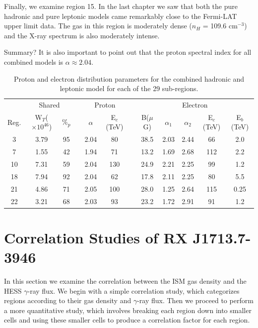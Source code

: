 \documentclass[12pt,a4paper]{article}
\begin{document}
Finally, we examine region 15. In the last chapter we saw that both the pure hadronic and pure leptonic models came remarkably close to the Fermi-LAT upper limit data. The gas in this region is moderately dense ($n_H$ = 109.6 cm$^{-3}$) and the X-ray spectrum is also moderately intense. 


Summary? It is also important to point out that the proton spectral index for all combined models is $\alpha \approx 2.04$. 
\begin{table}[H] 
	\begin{center}
		\begin{tabular}{cccccccccccc}
			\toprule 
			&
			\multicolumn{2}{c}{Shared} 
			&&
			\multicolumn{2}{c}{Proton} 
			&&
			\multicolumn{5}{c}{Electron}\\
			\cline{2-3} \cline{5-6} \cline{8-12}
			Reg.& W$_{T}$($\times 10^{46}$) & $\%_p$ && $\alpha$ & E$_c$(TeV) && B($\mu$G)&$\alpha_1$& $\alpha_2$ & E$_c$(TeV) & E$_b$(TeV)  \\
			\hline
			3 & 3.79 & 95 && 2.04 & 80 && 38.5 & 2.03 & 2.44 & 66 & 2.0\\
			7 & 1.55 & 42 && 1.94 & 71 && 13.2 & 1.69 & 2.68 & 112 & 2.2\\ 
			10 & 7.31 & 59 && 2.04 & 130 && 24.9 & 2.21 & 2.25 & 99 & 1.2\\ 
			18 & 7.94 & 92 && 2.04 & 62 && 17.8 & 2.11 & 2.25 & 80 & 5.5\\ 
			21 & 4.86 & 71 && 2.05 & 100 && 28.0 & 1.25 & 2.64 & 115 & 0.25\\ 
			22 & 3.21 & 68 && 2.03 & 93 && 23.2 & 1.72 & 2.91 & 91 & 1.2\\ 
			\bottomrule 
		\end{tabular} 
	\end{center}
	\caption{Proton and electron distribution parameters for the combined hadronic and leptonic model for each of the 29 sub-regions.}
	\label{tab:regionalparamscomb}
\end{table}


\newpage
\section{Correlation Studies of RX J1713.7-3946} \label{sec:corstudy}
In this section we examine the correlation between the ISM gas density and the HESS $\gamma$-ray flux. We begin with a simple correlation study, which categorizes regions according to their gas density and $\gamma$-ray flux. Then we proceed to perform a more quantitative study, which involves breaking each region down into smaller cells and using these smaller cells to produce a correlation factor for each region.
\end{document}
